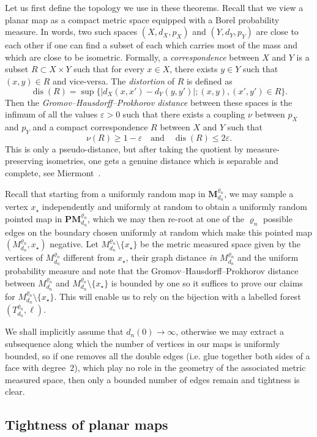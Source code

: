 \documentclass[10pt]{amsart}
\theoremstyle{definition}\newtheorem{defi}[theo]{Definition}\newtheorem{rema}[theo]{Remark}\newtheorem{exam}[theo]{Example}\newtheorem{exem}[theo]{Example}\newtheorem{nota}[theo]{Notation}
\newcommand{\1}{\ensembles{1}}
\newcommand{\Map}{\mathbf{M}}
\newcommand{\PMap}{\mathbf{PM}}
\renewcommand{\le}{\leqslant}
\renewcommand{\ge}{\geqslant}
\DeclareMathOperator{\dis}{dis}
\newcommand{\PMn}{\PMap_{d_n}^{\varrho_n}}
\newcommand{\Mn}{\Map_{d_n}^{\varrho_n}}
\newcommand{\mn}{M_{d_n}^{\varrho_n}}
\newcommand{\fn}{T_{d_n}^{\varrho_n}}
\providecommand{\?}{}
\begin{document}
Let us first define the topology we use in these theorems. Recall that we view a planar map as a compact metric space equipped with a Borel probability measure. In words, two such spaces $(X, d_X, p_X)$ and $(Y, d_Y, p_Y)$ are close to each other if one can find a subset of each which carries most of the mass and which are close to be isometric. Formally, a \emph{correspondence} between $X$ and $Y$ is a subset $R \subset X \times Y$ such that for every $x \in X$, there exists $y \in Y$ such that $(x,y) \in R$ and vice-versa. The \emph{distortion} of $R$ is defined as
\[
\dis(R) = \sup\big\{\left|d_X(x,x') - d_Y(y,y')\right| ; (x,y), (x', y') \in R\big\}.
\]
Then the \emph{Gromov--Hausdorff--Prokhorov distance} between these spaces is the infimum of all the values $\varepsilon > 0$ such that there exists a coupling $\nu$ between $p_X$ and $p_Y$ and a compact correspondence $R$ between $X$ and $Y$ such that
\[
\nu(R) \ge 1-\varepsilon \quad\text{and}\quad \dis(R) \le 2 \varepsilon.
\]
This is only a pseudo-distance, but after taking the quotient by measure-preserving isometries, one gets a genuine distance which is separable and complete, see Miermont~\cite[Proposition~6]{Mie09}.

Recall that starting from a uniformly random map in $\Mn$, we may sample a vertex $x_\star$ independently and uniformly at random to obtain a uniformly random pointed map in $\PMn$, which we may then re-root at one of the $\varrho_n$ possible edges on the boundary chosen uniformly at random which make this pointed map $(\mn, x_\star)$ negative. Let $\mn\setminus\{x_\star\}$ be the metric measured space given by the vertices of $\mn$ different from $x_\star$, their graph distance \emph{in $\mn$} and the uniform probability measure and note that the Gromov--Hausdorff--Prokhorov distance between $\mn$ and $\mn\setminus\{x_\star\}$ is bounded by one so it suffices to prove our claims for $\mn\setminus\{x_\star\}$. This will enable us to rely on the bijection with a labelled forest $(\fn, \ell)$.

We shall implicitly assume that $d_{n}(0) \to \infty$, otherwise we may extract a subsequence along which the number of vertices in our maps is uniformly bounded, so if one removes all the double edges (i.e. glue together both sides of a face with degree~$2$), which play no role in the geometry of the associated metric measured space, then only a bounded number of edges remain and tightness is clear.


\subsection{Tightness of planar maps}\label{sec:tension_cartes}
\end{document}
